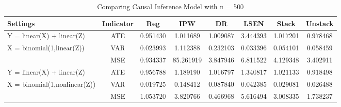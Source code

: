 \documentclass{elegantpaper}
\begin{document}
\begin{table}[H]
  \small
  \centering
  \caption{Comparing Causal Inference Model with n = 500}
    \begin{tabular}{llllllll}
    \toprule
    Settings & \multicolumn{1}{c}{Indicator} &\multicolumn{1}{c}{Reg} & \multicolumn{1}{c}{IPW} & \multicolumn{1}{c}{DR} & \multicolumn{1}{c}{LSEN} & \multicolumn{1}{c}{Stack} & \multicolumn{1}{c}{Unstack}\\
   
    \midrule
    Y = linear(X) + linear(Z) & \multicolumn{1}{c}{ATE} & \multicolumn{1}{c}{0.951430} & \multicolumn{1}{c}{1.011689} & \multicolumn{1}{c}{1.009087} & \multicolumn{1}{c}{3.444393}& \multicolumn{1}{c}{1.017201} & \multicolumn{1}{c}{0.978468}\\
    X = binomial(1,linear(Z)) & \multicolumn{1}{c}{VAR} & \multicolumn{1}{c}{ 0.023993} & \multicolumn{1}{c}{1.112388} & \multicolumn{1}{c}{0.232103} & \multicolumn{1}{c}{0.033396}& \multicolumn{1}{c}{ 0.054101} & \multicolumn{1}{c}{0.058459}\\
        & \multicolumn{1}{c}{MSE} & \multicolumn{1}{c}{0.934337} & \multicolumn{1}{c}{85.261919} & \multicolumn{1}{c}{3.847946} & \multicolumn{1}{c}{6.811522}& \multicolumn{1}{c}{4.129348} & \multicolumn{1}{c}{3.402911}\\%
  
     \midrule              
     Y = linear(X) + linear(Z) & \multicolumn{1}{c}{ATE} & \multicolumn{1}{c}{0.956788} & \multicolumn{1}{c}{1.189190} & \multicolumn{1}{c}{ 1.016797} & \multicolumn{1}{c}{ 1.340817}& \multicolumn{1}{c}{1.021133} & \multicolumn{1}{c}{ 0.918498}\\
    X = binomial(1,nonlinear(Z)) & \multicolumn{1}{c}{VAR} & \multicolumn{1}{c}{0.019725} & \multicolumn{1}{c}{0.148412} & \multicolumn{1}{c}{0.087840} & \multicolumn{1}{c}{0.042385}& \multicolumn{1}{c}{ 0.029081} & \multicolumn{1}{c}{0.026488}\\
     & \multicolumn{1}{c}{MSE} & \multicolumn{1}{c}{1.053720} & \multicolumn{1}{c}{ 3.820766} & \multicolumn{1}{c}{0.466968} & \multicolumn{1}{c}{ 5.616494}& \multicolumn{1}{c}{3.008335} & \multicolumn{1}{c}{1.738237}\\%
     

\end{tabular}
\end{table}
\end{document}
